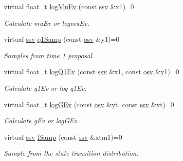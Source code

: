\begin{DoxyCompactItemize}
virtual float\+\_\+t \hyperlink{classBSFilter_ac219cb7510becb1be18dbb0b66b4c2c5}{log\+Mu\+Ev} (const \hyperlink{classBSFilter_a0b5bc93957fb6b6b1282f31fa2e01c3c}{ssv} \&x1)=0
\begin{DoxyCompactList}\small\item\em Calculate mu\+Ev or logmu\+Ev. \end{DoxyCompactList}\item 
virtual \hyperlink{classBSFilter_a0b5bc93957fb6b6b1282f31fa2e01c3c}{ssv} \hyperlink{classBSFilter_a457b10ec9f21aed47c2754b362a6859d}{q1\+Samp} (const \hyperlink{classBSFilter_ad8512328484d7c7bd7a3b7a9481d7f37}{osv} \&y1)=0
\begin{DoxyCompactList}\small\item\em Samples from time 1 proposal. \end{DoxyCompactList}\item 
virtual float\+\_\+t \hyperlink{classBSFilter_accd0c37510c408075939531766363390}{log\+Q1\+Ev} (const \hyperlink{classBSFilter_a0b5bc93957fb6b6b1282f31fa2e01c3c}{ssv} \&x1, const \hyperlink{classBSFilter_ad8512328484d7c7bd7a3b7a9481d7f37}{osv} \&y1)=0
\begin{DoxyCompactList}\small\item\em Calculate q1\+Ev or log q1\+Ev. \end{DoxyCompactList}\item 
virtual float\+\_\+t \hyperlink{classBSFilter_ae7ef5c414525879235f1e3b72833ced5}{log\+G\+Ev} (const \hyperlink{classBSFilter_ad8512328484d7c7bd7a3b7a9481d7f37}{osv} \&yt, const \hyperlink{classBSFilter_a0b5bc93957fb6b6b1282f31fa2e01c3c}{ssv} \&xt)=0
\begin{DoxyCompactList}\small\item\em Calculate g\+Ev or log\+G\+Ev. \end{DoxyCompactList}\item 
virtual \hyperlink{classBSFilter_a0b5bc93957fb6b6b1282f31fa2e01c3c}{ssv} \hyperlink{classBSFilter_a72ec2cf2887b3d236f5bc54cc5c5df95}{f\+Samp} (const \hyperlink{classBSFilter_a0b5bc93957fb6b6b1282f31fa2e01c3c}{ssv} \&xtm1)=0
\begin{DoxyCompactList}\small\item\em Sample from the state transition distribution. \end{DoxyCompactList}\end{DoxyCompactItemize}
